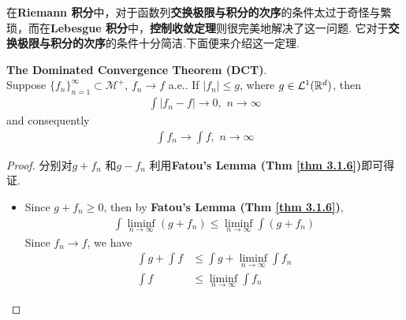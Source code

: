  	\vspace{2em}
 	在\textbf{Riemann 积分}中，对于函数列\textbf{交换极限与积分的次序}的条件太过于奇怪与繁琐，而在\textbf{Lebesgue 积分}中，\textbf{控制收敛定理}则很完美地解决了这一问题. 它对于\textbf{交换极限与积分的次序}的条件十分简洁.下面便来介绍这一定理.
 	\begin{thm}\label{thm 3.1.7}
 		\textbf{The Dominated Convergence Theorem (DCT)}. \\
 		Suppose $\{ f_n \}_{n = 1}^{\infty} \subset \mathcal{M}^{+}$, $f_n \rightarrow f$ a.e.. If $\left| f_n \right| \leq g$, where $g \in \mathcal{L}^{1}(\mathbb{R}^d)$, then
 		\begin{align}
 			\int{\left| f_n - f \right|} \to 0 , \,\, n \to \infty
 		\end{align}
 		and consequently
 		\begin{align}
 			\int{f_n} \to \int{f} , \,\, n \to \infty
 		\end{align}
 	
 		\vspace{3em}
 		\begin{proof}
 			分别对$g + f_n$ 和$g - f_n$ 利用\textbf{Fatou's Lemma (Thm \ref{thm 3.1.6})}即可得证.
 			\begin{itemize}
 				\item Since $g + f_n \geq 0$, then by \textbf{Fatou's Lemma (Thm \ref{thm 3.1.6})},
 				\begin{align}
 					\int{\liminf_{n \to \infty}{(g + f_n)}} \leq \liminf_{n \to \infty}{\int{(g + f_n)}} 
 				\end{align}
 				Since $f_n \to f$, we have
 				\begin{align}
 					\int{g} + \int{f} &\leq \int{g} + \liminf_{n \to \infty}{\int{f_n}} \\
 					\int{f} &\leq \liminf_{n \to \infty}{\int{f_n}}
 				\end{align}
 				
 				\vspace{1em}
 				

\end{itemize}
\end{proof}
\end{thm}

